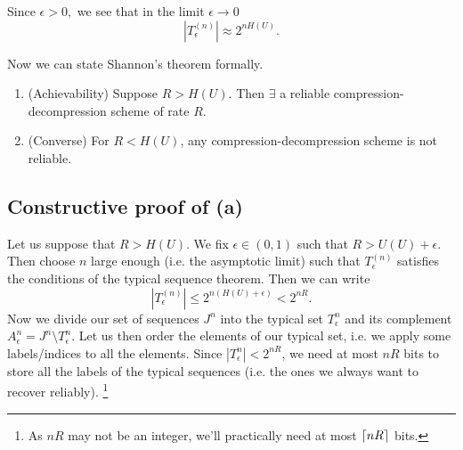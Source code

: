 Since $\epsilon>0,$ we see that in the limit $\epsilon\to 0$
\begin{equation}
    |T_{\epsilon}^{(n)}| \approx 2^{nH(U)}.
\end{equation}

Now we can state Shannon's theorem formally.
\begin{enumerate}
    \item (Achievability) Suppose $R>H(U)$. Then $\exists$ a reliable compression-decompression scheme of rate $R.$
    \item (Converse) For $R< H(U)$, any compression-decompression scheme is not reliable.
\end{enumerate}

\subsection*{Constructive proof of (a)} Let us suppose that $R>H(U)$. We fix $\epsilon \in (0,1)$ such that $R>U(U)+\epsilon$. Then choose $n$ large enough (i.e. the asymptotic limit) such that $T_\epsilon^{(n)}$ satisfies the conditions of the typical sequence theorem. Then we can write
\begin{equation}
    |T_\epsilon^{(n)}| \leq 2^{n(H(U)+\epsilon)}< 2^{nR}.
\end{equation}
Now we divide our set of sequences $J^n$ into the typical set $T_\epsilon^{n}$ and its complement $A_\epsilon^{n}=J^n \setminus T_\epsilon^{n}.$ Let us then order the elements of our typical set, i.e. we apply some labels/indices to all the elements. Since $|T_\epsilon^n| < 2^{nR}$, we need at most $nR$ bits to store all the labels of the typical sequences (i.e. the ones we always want to recover reliably).%
    \footnote{As $nR$ may not be an integer, we'll practically need at most $\lceil nR\rceil$ bits.}

